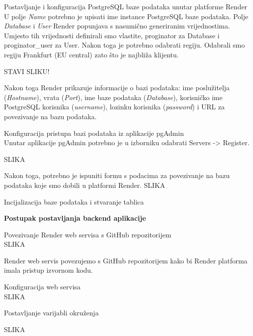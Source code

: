     \begin{packed_item}
		\item Postavljanje i konfiguracija PostgreSQL baze podataka unutar platforme Render \\
		
		U polje \textit{Name} potrebno je upisati ime instance PostgreSQL baze podataka. Polje \textit{Database} i \textit{User} Render popunjava s nasumično generiranim vrijednostima. Umjesto tih vrijednosti definirali smo vlastite, proginator za Database i proginator_user za User. Nakon toga je potrebno odabrati regiju. Odabrali smo regiju Frankfurt (EU central) zato što je najbliža klijentu. 
		
		STAVI SLIKU!
		
		Nakon toga Render prikazuje informacije o bazi podataka: ime poslužitelja (\textit{Hostname}), vrata (\textit{Port}), ime baze podataka (\textit{Database}), korisničko ime PostgreSQL korisnika (\textit{username}), lozinku korisnika (\textit{password}) i URL za povezivanje na bazu podataka. 
		
		
		\item Konfiguracija pristupa bazi podataka iz aplikacije pgAdmin \\
		Unutar aplikacije pgAdmin potrebno je u izborniku odabrati Servers -> Register.
		
		SLIKA 
		
		Nakon toga, potrebno je ispuniti formu s podacima za povezivanje na bazu podataka koje smo dobili u platformi Render.
		SLIKA
		
		
        \item Incijalizacija baze podataka i stvaranje tablica \\

                   				
	 \end{packed_item}


\textbf{Postupak postavljanja backend aplikacije}

\begin{packed_item}
        \item Povezivanje Render web servisa s GitHub repozitorijem \\
  SLIKA 
        
         Render web servis povezujemo s GitHub repozitorijem kako bi Render platforma imala pristup izvornom kodu.
         
        \item Konfiguracija web servisa \\
        
        SLIKA
        \item Postavljanje varijabli okruženja
        
        SLIKA	
\end{packed_item}

